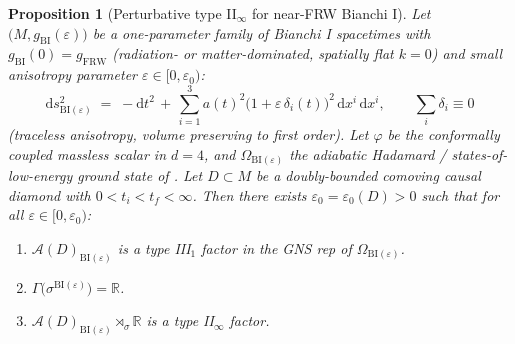 \documentclass[11pt]{article}
\newtheorem{proposition}[theorem]{Proposition}
\theoremstyle{definition}
\newcommand{\R}{\mathbb{R}}
\renewcommand{\AA}{\mathcal{A}}
\newcommand{\BI}{\mathrm{BI}}
\newcommand{\FRW}{\mathrm{FRW}}
\begin{document}
\begin{proposition}[Perturbative type II$_\infty$ for near-FRW Bianchi I]\label{prop:B1}
Let $\bigl(M, g_\BI(\varepsilon)\bigr)$ be a one-parameter family of
Bianchi I spacetimes with $g_\BI(0) = g_\FRW$ (radiation- or
matter-dominated, spatially flat $k=0$) and small anisotropy parameter
$\varepsilon\in[0,\varepsilon_0)$:
\begin{equation}\label{eq:perturb-metric}
\mathrm{d}s^2_{\BI(\varepsilon)} \;=\; -\mathrm dt^2
   \,+\, \sum_{i=1}^3 a(t)^2 \bigl(1 + \varepsilon\,\delta_i(t)\bigr)^2\,\mathrm dx^i\,\mathrm dx^i,
\qquad \sum_i \delta_i \equiv 0
\end{equation}
(traceless anisotropy, volume preserving to first order). Let $\varphi$
be the conformally coupled massless scalar in $d=4$, and
$\Omega_{\BI(\varepsilon)}$ the adiabatic Hadamard / states-of-low-energy
ground state of \cite{Pereira2018, ThemBrum2013}. Let $D\subset M$ be
a doubly-bounded comoving causal diamond with $0<t_i<t_f<\infty$. Then
there exists $\varepsilon_0 = \varepsilon_0(D)>0$ such that for all
$\varepsilon\in[0,\varepsilon_0)$:
\begin{enumerate}
\item $\AA(D)_{\BI(\varepsilon)}$ is a type III$_1$ factor in the GNS rep
  of $\Omega_{\BI(\varepsilon)}$.
\item $\Gamma\bigl(\sigma^{\BI(\varepsilon)}\bigr) = \R$.
\item $\AA(D)_{\BI(\varepsilon)} \rtimes_\sigma \R$ is a type II$_\infty$
  factor.
\end{enumerate}
\end{proposition}
\end{document}
